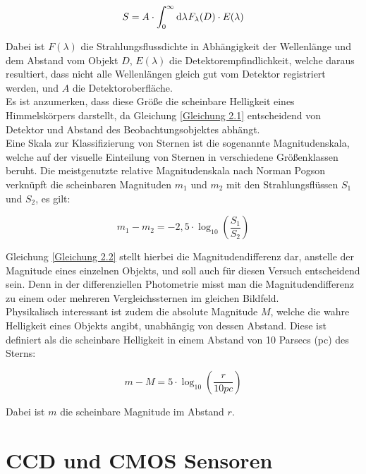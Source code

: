 \documentclass[ngerman,ruledheaders=section,class=report,thesis={type=Protokoll},accentcolor=1b,marginpar=false,parskip=half-,fontsize=11pt,]{tudapub}
\begin{document}
	\begin{equation}
		S = A \cdot \int_{0}^{\infty} \mathrm{d\lambda} \hspace{0.2mm} F_\lambda(D) \cdot E(\lambda)
		\label{Gleichung 2.1}
	\end{equation}
	
	Dabei ist $F(\lambda)$ die Strahlungsflussdichte in Abhängigkeit der Wellenlänge und dem Abstand vom Objekt $D$, $E(\lambda)$ die Detektorempfindlichkeit, welche daraus resultiert, dass nicht alle Wellenlängen gleich gut vom Detektor registriert werden, und $A$ die Detektoroberfläche. \\
	Es ist anzumerken, dass diese Größe die scheinbare Helligkeit eines Himmelskörpers darstellt, da Gleichung \ref{Gleichung 2.1} entscheidend von Detektor und Abstand des Beobachtungsobjektes abhängt. \\
	Eine Skala zur Klassifizierung von Sternen ist die sogenannte Magnitudenskala, welche auf der visuelle Einteilung von Sternen in verschiedene Größenklassen beruht. Die meistgenutzte relative Magnitudenskala nach Norman Pogson verknüpft die scheinbaren Magnituden $m_1$ und $m_2$ mit den Strahlungsflüssen $S_1$ und $S_2$, es gilt:
	
	\begin{equation}
		m_1 - m_2 = -2,5 \cdot \log_{10} \left( \frac{S_1}{S_2}\right)
		\label{Gleichung 2.2}
	\end{equation}
	
	Gleichung \ref{Gleichung 2.2} stellt hierbei die Magnitudendifferenz dar, anstelle der Magnitude eines einzelnen Objekts, und soll auch für diesen Versuch entscheidend sein. Denn in der differenziellen Photometrie misst man die Magnitudendifferenz zu einem oder mehreren Vergleichssternen im gleichen Bildfeld. \\
	Physikalisch interessant ist zudem die absolute Magnitude $M$, welche die wahre Helligkeit eines Objekts angibt, unabhängig von dessen Abstand. Diese ist definiert als die scheinbare Helligkeit in einem Abstand von 10 Parsecs (pc) des Sterns:
	
	\begin{equation}
		m - M = 5 \cdot \log_{10} \left( \frac{r}{10 \si{pc}} \right)  
		\label{Gleichung 2.3}
	\end{equation}
	
	Dabei ist $m$ die scheinbare Magnitude im Abstand $r$.
	
	\section{CCD und CMOS Sensoren}
\end{document}
